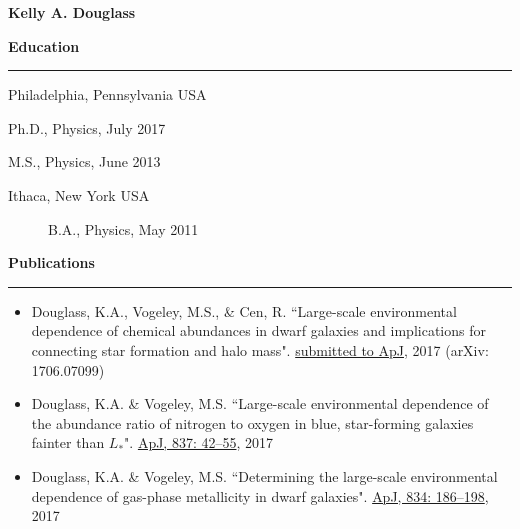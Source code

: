 \newcommand{\sectionrule}{\noindent \hfil\rule{\textwidth}{.6pt}\hfil}

\iffinal{}{\newpage}

\begin{vita}

{\Large\bf Kelly A. Douglass}

\singlespacing


\noindent
{\large\bf {\sc Education}}

\sectionrule
\vspace{1mm}

\begin{description}[noitemsep]
    \item[Drexel University] Philadelphia, Pennsylvania USA
    \begin{description}[noitemsep]
	    \item[] Ph.D., Physics, July 2017
	    \item[] M.S., Physics, June 2013
    \end{description}
    \item[Cornell University] Ithaca, New York USA
    \begin{description}
	    \item[] B.A., Physics, May 2011
    \end{description}
\end{description}



\noindent
{\large\bf {\sc Publications}}

\sectionrule

\begin{itemize} %
    \item Douglass, K.A., Vogeley, M.S., \& Cen, R.  ``Large-scale environmental dependence of chemical abundances in dwarf galaxies and implications for connecting star formation and halo mass". \href{https://arxiv.org/abs/1706.07099}{submitted to ApJ}, 2017 (arXiv: 1706.07099)
	\item Douglass, K.A. \& Vogeley, M.S.  ``Large-scale environmental dependence of the abundance ratio of nitrogen to oxygen in blue, star-forming galaxies fainter than $L_*$". \href{https://doi.org/10.3847/1538-4357/aa5e53}{ApJ, 837: 42--55}, 2017
	\item Douglass, K.A. \& Vogeley, M.S.  ``Determining the large-scale environmental dependence of gas-phase metallicity in dwarf galaxies". \href{https://doi.org/10.3847/1538-4357/834/2/186}{ApJ, 834: 186--198}, 2017
\end{itemize}




\end{vita}

